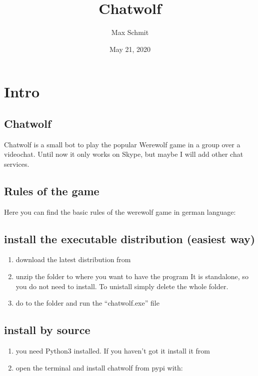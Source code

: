 \documentclass[letterpaper,10pt,english]{sphinxmanual}
\title{Chatwolf}
\date{May 21, 2020}
\author{Max Schmit}
\begin{document}
\pagestyle{empty}
\sphinxmaketitle
\pagestyle{plain}
\sphinxtableofcontents
\pagestyle{normal}
\label{\detokenize{index::doc}}



\chapter{Intro}
\label{\detokenize{intro:intro}}\label{\detokenize{intro::doc}}

\section{Chatwolf}
\label{\detokenize{data/Readme:chatwolf}}\label{\detokenize{data/Readme::doc}}
Chatwolf is a small bot to play the popular Werewolf game in a group over a videochat.
Until now it only works on Skype, but maybe I will add other chat services.


\section{Rules of the game}
\label{\detokenize{data/Readme:rules-of-the-game}}
Here you can find the basic rules of the werewolf game in german language:


\section{install the executable distribution (easiest way)}
\label{\detokenize{data/Readme:install-the-executable-distribution-easiest-way}}\begin{enumerate}
%
\item {} 
download the latest distribution from 

\item {} 
unzip the folder to where you want to have the program
It is standalone, so you do not need to install. To unistall simply delete the whole folder.

\item {} 
do to the folder and run the “chatwolf.exe” file

\end{enumerate}


\section{install by source}
\label{\detokenize{data/Readme:install-by-source}}\begin{enumerate}
%
\item {} 
you need Python3 installed.
If you haven’t got it install it from 

\item {} 
open the terminal and install chatwolf from pypi with:

\end{enumerate}
\end{document}

